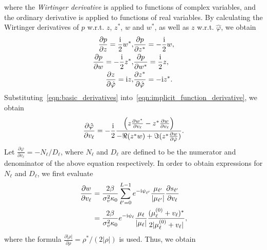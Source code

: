 \documentclass[journal,twocolumn]{IEEEtran}
\theoremstyle{nonumberplain}
\def \ri {{\rm i}}
\begin{document}
{\begin{equation}
        \label{eqn:implicit_function_derivative} 
    \end{equation}
    where the {\it Wirtinger derivative} is applied to functions of complex variables, and the ordinary derivative is applied to functions of real variables. 
    By calculating the Wirtinger derivatives of $p$ w.r.t. $z$, $z^*$, $w$ and $w^*$, as well as $z$ w.r.t. $\hat{\varphi}$, we obtain 
    \begin{equation}
        \begin{aligned}
        \frac{\partial p}{\partial z}=\frac{\ri}{2} w^*, & \frac{\partial p}{\partial z^*}=-\frac{\ri}{2} w, \\
        \frac{\partial p}{\partial w}=-\frac{\ri}{2} z^*, & \frac{\partial p}{\partial w^*}=\frac{\ri}{2} z, \\
        \frac{\partial z}{\partial \hat\varphi}=\ri z, & \frac{\partial z^*}{\partial \hat\varphi}=-\ri z^*. 
        \end{aligned}
        \label{eqn:basic_derivatives}
    \end{equation}
    Substituting~\eqref{eqn:basic_derivatives} into~\eqref{eqn:implicit_function_derivative}, we obtain 
    \begin{equation}
        \frac{\partial \hat\varphi}{\partial v_\ell} = -\frac{\ri}{2}\frac{\left( z\frac{\partial w^*}{\partial v_\ell} -z^* \frac{\partial w}{\partial v_\ell} \right)}{-\Re(z^*w) +\Im(z^* \frac{\partial w}{\partial \hat{\varphi}})}. 
    \end{equation}
    Let $\frac{\partial \varphi}{\partial v_\ell} = -N_\ell / D_\ell$, where $N_\ell$ and $D_\ell$ are defined to be the numerator and denominator of the above equation respectively. In order to obtain expressions for $N_\ell$ and $D_\ell$, we first evaluate 
    \begin{equation}
        \begin{aligned}
            \frac{\partial w}{\partial v_\ell}&=\frac{2\beta}{\sigma_v^2 \kappa_0} \sum_{\ell'=0}^{L-1} e^{-\ri \psi_{\ell'}} \frac{\mu_{\ell'}}{|\mu_{\ell'}|} \frac{\partial s_{\ell'}}{\partial v_\ell} \\
            &= \frac{2\beta}{\sigma_v^2 \kappa_0} e^{-\ri \psi_\ell}\frac{\mu_\ell}{|\mu_\ell|} \frac{(\mu_\ell^{(0)} + v_\ell)^*}{2|\mu_\ell^{(0)} + v_\ell|}, 
        \end{aligned}
    \end{equation}
    where the formula $\frac{\partial |\rho|}{\partial \rho}  = \rho^*/(2|\rho|)$ is used. 
    Thus, we obtain 
    \begin{equation}

\end{equation}}
\end{document}
